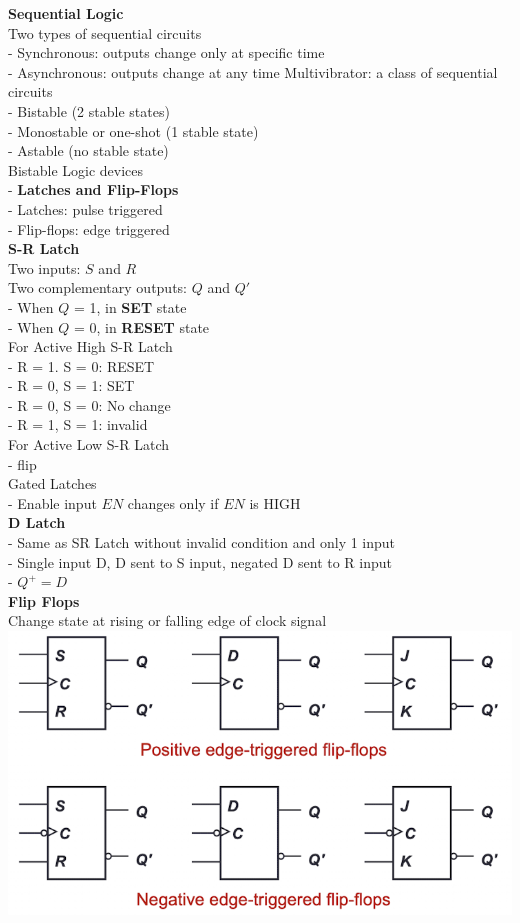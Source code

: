 \documentclass[10pt, a4paper]{article}
\newcommand{\highlight}[1]{{\color{red}\textbf{#1}}}
\begin{document}
\begin{multicols*}{3}
		{\normalsize\textbf{Sequential Logic}}\\
		Two types of sequential circuits\\
		- Synchronous: outputs change only at specific time\\
		- Asynchronous: outputs change at any time
		Multivibrator: a class of sequential circuits\\
		- Bistable (2 stable states)\\
		- Monostable or one-shot (1 stable state)\\
		- Astable (no stable state)\\
		Bistable Logic devices\\
		- \textbf{Latches and Flip-Flops}\\
		- Latches: pulse triggered\\
		- Flip-flops: edge triggered\\
		\textbf{S-R Latch}\\
		Two inputs: $S$ and $R$\\
		Two complementary outputs: $Q$ and $Q'$\\
			- When $Q$ = 1, in \highlight{SET} state\\
			- When $Q$ = 0, in \highlight{RESET} state\\
		For Active High S-R Latch\\
			- R = 1. S = 0: RESET\\
			- R = 0, S = 1: SET\\
			- R = 0, S = 0: No change\\
			- R = 1, S = 1: invalid\\
		For Active Low S-R Latch\\
			- flip\\
		Gated Latches\\
			- Enable input $EN$ changes only if $EN$ is HIGH\\
		\textbf{D Latch}\\
		- Same as SR Latch without invalid condition and only 1 input\\
		- Single input D, D sent to S input, negated D sent to R input\\
		- $Q^+ = D$\\

		\textbf{Flip Flops}\\
		Change state at rising or falling edge of clock signal\\
		\includegraphics[scale=.4]{./assets/flipflops}
		

\end{multicols*}
\end{document}
